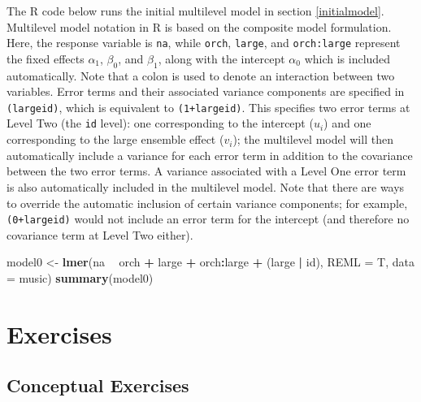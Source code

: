 \documentclass[
]{krantz}
\newenvironment{Shaded}{\begin{snugshade}}{\end{snugshade}}
\newcommand{\DataTypeTok}[1]{\textcolor[rgb]{0.27,0.27,0.27}{#1}}
\newcommand{\KeywordTok}[1]{\textcolor[rgb]{0.27,0.27,0.27}{\textbf{#1}}}
\newcommand{\NormalTok}[1]{#1}
\newcommand{\OperatorTok}[1]{\textcolor[rgb]{0.43,0.43,0.43}{\textbf{#1}}}
\newcommand{\StringTok}[1]{\textcolor[rgb]{0.5,0.5,0.5}{#1}}
\begin{document}
The R code below runs the initial multilevel model  in section \ref{initialmodel}. Multilevel model notation in R is based on the composite model formulation. Here, the response variable is \texttt{na}, while \texttt{orch}, \texttt{large}, and \texttt{orch:large} represent the fixed effects \(\alpha_{1}\), \(\beta_{0}\), and \(\beta_{1}\), along with the intercept \(\alpha_{0}\) which is included automatically. Note that a colon is used to denote an interaction between two variables. Error terms and their associated variance components are specified in \texttt{(large\textbar{}id)}, which is equivalent to \texttt{(1+large\textbar{}id)}. This specifies two error terms at Level Two (the \texttt{id} level): one corresponding to the intercept (\(u_{i}\)) and one corresponding to the large ensemble effect (\(v_{i}\)); the multilevel model will then automatically include a variance for each error term in addition to the covariance between the two error terms. A variance associated with a Level One error term is also automatically included in the multilevel model. Note that there are ways to override the automatic inclusion of certain variance components; for example, \texttt{(0+large\textbar{}id)} would not include an error term for the intercept (and therefore no covariance term at Level Two either).

\begin{Shaded}
\begin{Highlighting}[]
\NormalTok{model0 <-}\StringTok{ }\KeywordTok{lmer}\NormalTok{(na }\OperatorTok{~}\StringTok{ }\NormalTok{orch }\OperatorTok{+}\StringTok{ }\NormalTok{large }\OperatorTok{+}\StringTok{ }\NormalTok{orch}\OperatorTok{:}\NormalTok{large }\OperatorTok{+}
\StringTok{  }\NormalTok{(large }\OperatorTok{|}\StringTok{ }\NormalTok{id), }\DataTypeTok{REML =}\NormalTok{ T, }\DataTypeTok{data =}\NormalTok{ music)}
\KeywordTok{summary}\NormalTok{(model0)}
\end{Highlighting}
\end{Shaded}

\hypertarget{exercises-7}{%
\section{Exercises}\label{exercises-7}}

\hypertarget{conceptual-exercises-5}{%
\subsection{Conceptual Exercises}\label{conceptual-exercises-5}}
\end{document}
